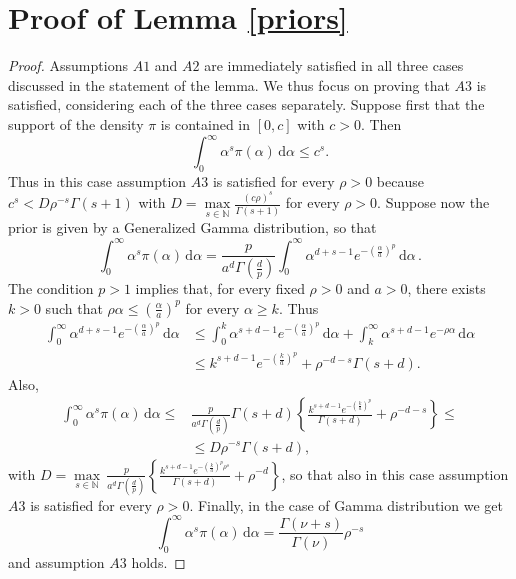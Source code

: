 \documentclass[12pt]{article}
\def \d {\mathrm{d}}
\begin{document}
\section{Proof of Lemma \ref{priors}}
\begin{proof}
Assumptions $A1$ and $A2$ are immediately satisfied in all three cases discussed in the statement of the lemma. We thus focus on proving that $A3$ is satisfied, considering each of the three cases separately.
Suppose first that the support of the density $\pi$ is contained in $[0,c]$ with $c > 0$. Then
\[
\int_0^{\infty} \alpha^s \pi(\alpha) \, \d\alpha \leq c^s.
\]
Thus in this case assumption $A3$ is satisfied for every $\rho>0$ because $c^s < D\rho^{-s}\Gamma(s+1)$ with $D = \underset{s \in \mathbb{N}}{\max} \frac{(c\rho)^s}{\Gamma(s+1)}$ for every $\rho > 0$.
Suppose now the prior is given by a Generalized Gamma distribution, so that
\[
\int_0^{\infty} \alpha^s \pi(\alpha) \, \d\alpha = \frac{p}{a^d\Gamma\left(\frac{d}{p} \right)} \int_0^{\infty} \alpha^{d+s-1}e^{-\left(\frac{\alpha}{a} \right)^p} \, \d\alpha\,.
\]
The condition $p>1$ implies that, for every fixed $\rho > 0$ and $a > 0$, there exists $k > 0$ such that $\rho \alpha \leq \left(\frac{\alpha}{a}\right)^p$ for every $\alpha \geq k$. Thus
\[
\begin{aligned}
\int_0^{\infty} \alpha^{d+s-1}e^{-\left(\frac{\alpha}{a} \right)^p} \, \d\alpha &\leq \int_0^k \alpha^{s+d-1}e^{-\left(\frac{\alpha}{a}\right)^p} \, \d \alpha + \int_k^\infty \alpha^{s+d-1}e^{-\rho \alpha} \, \d \alpha \\
& \leq  k^{s+d-1}e^{-\left(\frac{k}{a}\right)^p} + \rho^{-d-s}\Gamma(s+d).
\end{aligned}
\]
Also,
\[
\begin{aligned}
\int_0^{\infty} \alpha^s \pi(\alpha) \, \d\alpha \leq& \frac{p}{a^d\Gamma\left(\frac{d}{p} \right)}\Gamma(s+d) \left\{  \frac{k^{s+d-1}e^{-\left(\frac{k}{a}\right)^p}}{\Gamma(s+d)} + \rho^{-d-s}\right\} \leq\\
& \leq D\rho^{-s}\Gamma(s+d),
\end{aligned}
\]
with $D = \underset{s \in \mathbb{N}}{\max} \, \frac{p}{a^d\Gamma\left(\frac{d}{p} \right)} \left\{  \frac{k^{s+d-1}e^{-\left(\frac{k}{a}\right)^p\rho^s}}{\Gamma(s+d)} + \rho^{-d}\right\}$, so that also in this case assumption $A3$ is satisfied for every $\rho > 0$. 
Finally, in the case of Gamma distribution we get
\[
\int_0^{\infty} \alpha^s \pi(\alpha) \, \d\alpha = \frac{\Gamma(\nu+s)}{\Gamma(\nu)}\rho^{-s}
\]
and assumption $A3$ holds.
\end{proof}
\end{document}
